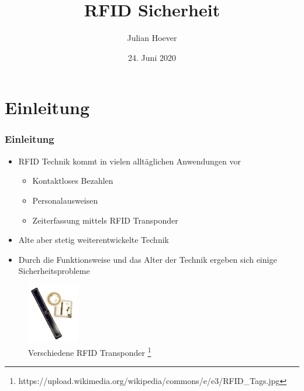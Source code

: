 \documentclass{beamer}
\title{RFID Sicherheit}
\author{Julian Hoever}
\date{24. Juni 2020}
\begin{document}
\begin{frame}
\titlepage
\end{frame}


\section{Einleitung}
\begin{frame}
\frametitle{Einleitung}


\begin{itemize}
	\item RFID Technik kommt in vielen alltäglichen Anwendungen vor
	\begin{itemize}
		\item Kontaktloses Bezahlen
		\item Personalausweisen
		\item Zeiterfassung mittels RFID Transponder
	\end{itemize}
	\item Alte aber stetig weiterentwickelte Technik
	\item Durch die Funktionsweise und das Alter der Technik ergeben sich einige Sicherheitsprobleme
\end{itemize}

\begin{figure}
\includegraphics[width=0.2\textwidth]{img/RFID_Tags.jpg}
\caption{Verschiedene RFID Transponder \footnote{https://upload.wikimedia.org/wikipedia/commons/e/e3/RFID\_Tags.jpg}}
\end{figure}
\end{frame}
\end{document}
